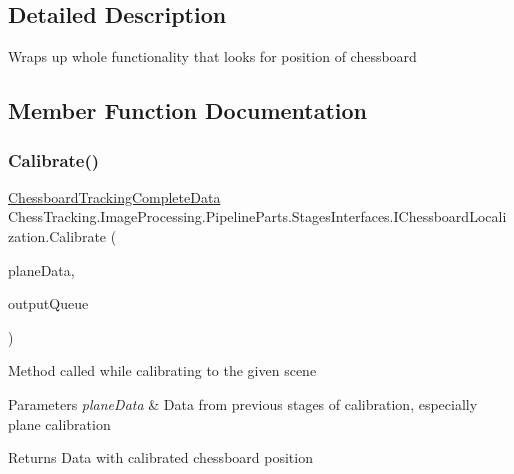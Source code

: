 \subsection{Detailed Description}
Wraps up whole functionality that looks for position of chessboard 



\subsection{Member Function Documentation}
\mbox{\label{interface_chess_tracking_1_1_image_processing_1_1_pipeline_parts_1_1_stages_interfaces_1_1_i_chessboard_localization_a123320210fd4312b27bea5f39a7c57f0}} 
\subsubsection{\texorpdfstring{Calibrate()}{Calibrate()}}
{\footnotesize\ttfamily \mbox{\hyperlink{class_chess_tracking_1_1_image_processing_1_1_pipeline_data_1_1_chessboard_tracking_complete_data}{Chessboard\+Tracking\+Complete\+Data}} Chess\+Tracking.\+Image\+Processing.\+Pipeline\+Parts.\+Stages\+Interfaces.\+I\+Chessboard\+Localization.\+Calibrate (\begin{DoxyParamCaption}\item[{\mbox{\hyperlink{class_chess_tracking_1_1_image_processing_1_1_pipeline_data_1_1_plane_tracking_complete_data}{Plane\+Tracking\+Complete\+Data}}}]{plane\+Data,  }\item[{Blocking\+Collection$<$ \mbox{\hyperlink{class_chess_tracking_1_1_multithreading_messages_1_1_message}{Message}} $>$}]{output\+Queue }\end{DoxyParamCaption})}



Method called while calibrating to the given scene 


\begin{DoxyParams}{Parameters}
{\em plane\+Data} & Data from previous stages of calibration, especially plane calibration\\
\hline
\end{DoxyParams}
\begin{DoxyReturn}{Returns}
Data with calibrated chessboard position
\end{DoxyReturn}


